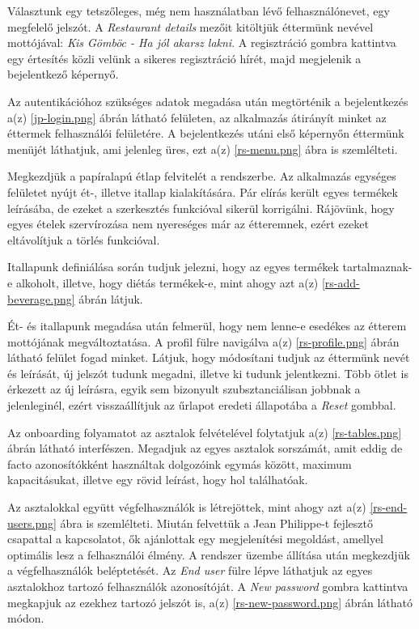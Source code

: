 Választunk egy tetszőleges, még nem használatban lévő felhasználónevet, egy megfelelő jelszót. A \emph{Restaurant details} mezőit kitöltjük éttermünk nevével mottójával: \emph{Kis Gömböc - Ha jól akarsz lakni}. A regisztráció gombra kattintva egy értesítés közli velünk a sikeres regisztráció hírét, majd megjelenik a bejelentkező képernyő.


Az autentikációhoz szükséges adatok megadása után megtörténik a bejelentkezés a(z) \ref{jp-login.png} ábrán látható felületen, az alkalmazás átirányít minket az éttermek felhasználói felületére. A bejelentkezés utáni első képernyőn éttermünk menüjét láthatjuk, ami jelenleg üres, ezt a(z) \ref{rs-menu.png} ábra is szemlélteti.

Megkezdjük a papíralapú étlap felvitelét a rendszerbe. Az alkalmazás egységes felületet nyújt ét-, illetve itallap kialakítására. Pár elírás került egyes termékek leírásába, de ezeket a szerkesztés funkcióval sikerül korrigálni. Rájövünk, hogy egyes ételek szervírozása nem nyereséges már az étteremnek, ezért ezeket eltávolítjuk a törlés funkcióval.


Itallapunk definiálása során tudjuk jelezni, hogy az egyes termékek tartalmaznak-e alkoholt, illetve, hogy diétás termékek-e, mint ahogy azt a(z) \ref{rs-add-beverage.png} ábrán látjuk.

Ét- és itallapunk megadása után felmerül, hogy nem lenne-e esedékes az étterem mottójának megváltoztatása. A profil fülre navigálva a(z) \ref{rs-profile.png} ábrán látható felület fogad minket. Látjuk, hogy módosítani tudjuk az éttermünk nevét és leírását, új jelszót tudunk megadni, illetve ki tudunk jelentkezni. Több ötlet is érkezett az új leírásra, egyik sem bizonyult szubsztanciálisan jobbnak a jelenleginél, ezért visszaállítjuk az űrlapot eredeti állapotába a \emph{Reset} gombbal.

Az onboarding folyamatot az asztalok felvételével folytatjuk a(z) \ref{rs-tables.png} ábrán látható interfészen. Megadjuk az egyes asztalok sorszámát, amit eddig de facto azonosítókként használtak dolgozóink egymás között, maximum kapacitásukat, illetve egy rövid leírást, hogy hol találhatóak.


Az asztalokkal együtt végfelhasználók is létrejöttek, mint ahogy azt a(z) \ref{rs-end-users.png} ábra is szemlélteti. Miután felvettük a Jean Philippe-t fejlesztő csapattal a kapcsolatot, ők ajánlottak egy megjelenítési megoldást, amellyel optimális lesz a felhasználói élmény. A rendszer üzembe állítása után megkezdjük a végfelhasználók beléptetését. Az \emph{End user} fülre lépve láthatjuk az egyes asztalokhoz tartozó felhasználók azonosítóját. A \emph{New password} gombra kattintva megkapjuk az ezekhez tartozó jelszót is, a(z) \ref{rs-new-password.png} ábrán látható módon.


